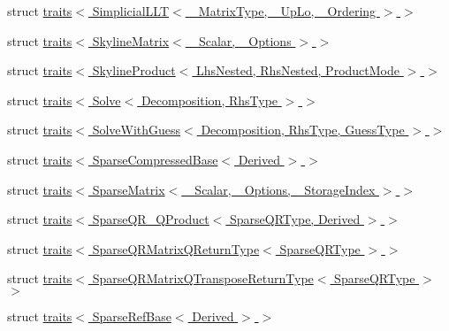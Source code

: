 \begin{DoxyCompactItemize}
\item 
struct \hyperlink{struct_eigen_1_1internal_1_1traits_3_01_simplicial_l_l_t_3_01___matrix_type_00_01___up_lo_00_01___ordering_01_4_01_4}{traits$<$ Simplicial\+L\+L\+T$<$ \+\_\+\+Matrix\+Type, \+\_\+\+Up\+Lo, \+\_\+\+Ordering $>$ $>$}
\item 
struct \hyperlink{struct_eigen_1_1internal_1_1traits_3_01_skyline_matrix_3_01___scalar_00_01___options_01_4_01_4}{traits$<$ Skyline\+Matrix$<$ \+\_\+\+Scalar, \+\_\+\+Options $>$ $>$}
\item 
struct \hyperlink{struct_eigen_1_1internal_1_1traits_3_01_skyline_product_3_01_lhs_nested_00_01_rhs_nested_00_01_product_mode_01_4_01_4}{traits$<$ Skyline\+Product$<$ Lhs\+Nested, Rhs\+Nested, Product\+Mode $>$ $>$}
\item 
struct \hyperlink{struct_eigen_1_1internal_1_1traits_3_01_solve_3_01_decomposition_00_01_rhs_type_01_4_01_4}{traits$<$ Solve$<$ Decomposition, Rhs\+Type $>$ $>$}
\item 
struct \hyperlink{struct_eigen_1_1internal_1_1traits_3_01_solve_with_guess_3_01_decomposition_00_01_rhs_type_00_01_guess_type_01_4_01_4}{traits$<$ Solve\+With\+Guess$<$ Decomposition, Rhs\+Type, Guess\+Type $>$ $>$}
\item 
struct \hyperlink{struct_eigen_1_1internal_1_1traits_3_01_sparse_compressed_base_3_01_derived_01_4_01_4}{traits$<$ Sparse\+Compressed\+Base$<$ Derived $>$ $>$}
\item 
struct \hyperlink{struct_eigen_1_1internal_1_1traits_3_01_sparse_matrix_3_01___scalar_00_01___options_00_01___storage_index_01_4_01_4}{traits$<$ Sparse\+Matrix$<$ \+\_\+\+Scalar, \+\_\+\+Options, \+\_\+\+Storage\+Index $>$ $>$}
\item 
struct \hyperlink{struct_eigen_1_1internal_1_1traits_3_01_sparse_q_r___q_product_3_01_sparse_q_r_type_00_01_derived_01_4_01_4}{traits$<$ Sparse\+Q\+R\+\_\+\+Q\+Product$<$ Sparse\+Q\+R\+Type, Derived $>$ $>$}
\item 
struct \hyperlink{struct_eigen_1_1internal_1_1traits_3_01_sparse_q_r_matrix_q_return_type_3_01_sparse_q_r_type_01_4_01_4}{traits$<$ Sparse\+Q\+R\+Matrix\+Q\+Return\+Type$<$ Sparse\+Q\+R\+Type $>$ $>$}
\item 
struct \hyperlink{struct_eigen_1_1internal_1_1traits_3_01_sparse_q_r_matrix_q_transpose_return_type_3_01_sparse_q_r_type_01_4_01_4}{traits$<$ Sparse\+Q\+R\+Matrix\+Q\+Transpose\+Return\+Type$<$ Sparse\+Q\+R\+Type $>$ $>$}
\item 
struct \hyperlink{struct_eigen_1_1internal_1_1traits_3_01_sparse_ref_base_3_01_derived_01_4_01_4}{traits$<$ Sparse\+Ref\+Base$<$ Derived $>$ $>$}

\end{DoxyCompactItemize}
